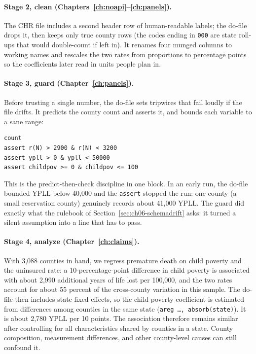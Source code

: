 \paragraph{Stage 2, clean (Chapters~\ref{ch:noapi}--\ref{ch:panels}).} The CHR file includes a second header row of human-readable labels; the do-file drops it, then keeps only true county rows (the codes ending in \texttt{000} are state roll-ups that would double-count if left in). It renames four munged columns to working names and rescales the two rates from proportions to percentage points so the coefficients later read in units people plan in.

\paragraph{Stage 3, guard (Chapter~\ref{ch:panels}).} Before trusting a single number, the do-file sets tripwires that fail loudly if the file drifts. It predicts the county count and asserts it, and bounds each variable to a sane range:
\par
{\footnotesize
\begin{verbatim}
count
assert r(N) > 2900 & r(N) < 3200
assert ypll > 0 & ypll < 50000
assert childpov >= 0 & childpov <= 100
\end{verbatim}
}
This is the predict-then-check discipline in one block. In an early run, the do-file bounded YPLL below 40,000 and the \texttt{assert} stopped the run: one county (a small reservation county) genuinely records about 41,000 YPLL. The guard did exactly what the rulebook of Section~\ref{sec:ch06-schemadrift} asks: it turned a silent assumption into a line that has to pass.

\paragraph{Stage 4, analyze (Chapter~\ref{ch:claims}).} With 3,088 counties in hand, we regress premature death on child poverty and the uninsured rate: a 10-percentage-point difference in child poverty is associated with about 2,990 additional years of life lost per 100,000, and the two rates account for about 55 percent of the cross-county variation in this sample. The do-file then includes state fixed effects, so the child-poverty coefficient is estimated from differences among counties in the same state (\texttt{areg \ldots, absorb(state)}). It is about 2,780 YPLL per 10 points. The association therefore remains similar after controlling for all characteristics shared by counties in a state. County composition, measurement differences, and other county-level causes can still confound it.


